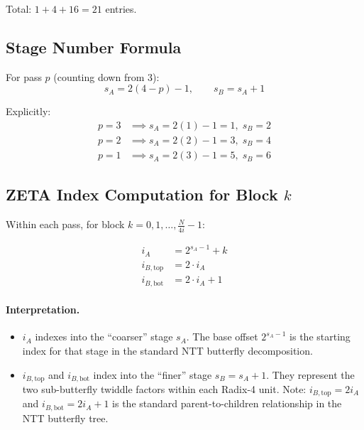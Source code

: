 \documentclass[11pt,a4paper]{article}
\begin{document}
Total: $1 + 4 + 16 = 21$ entries.

\subsection{Stage Number Formula}

For pass $p$ (counting down from 3):
\begin{equation}
  s_A = 2(4 - p) - 1, \qquad s_B = s_A + 1
  \label{eq:stage-map}
\end{equation}

Explicitly:
\begin{align*}
  p = 3 &\implies s_A = 2(1) - 1 = 1,\; s_B = 2 \\
  p = 2 &\implies s_A = 2(2) - 1 = 3,\; s_B = 4 \\
  p = 1 &\implies s_A = 2(3) - 1 = 5,\; s_B = 6
\end{align*}

\subsection{ZETA Index Computation for Block $k$}

Within each pass, for block $k = 0, 1, \ldots, \frac{N}{4i} - 1$:

\begin{align}
  i_A         &= 2^{s_A - 1} + k \label{eq:iA}\\
  i_{B,\text{top}} &= 2 \cdot i_A \label{eq:iB-top}\\
  i_{B,\text{bot}} &= 2 \cdot i_A + 1 \label{eq:iB-bot}
\end{align}

\paragraph{Interpretation.}
\begin{itemize}
  \item $i_A$ indexes into the ``coarser'' stage $s_A$. The base offset $2^{s_A-1}$ is the starting index for that stage in the standard NTT butterfly decomposition.
  \item $i_{B,\text{top}}$ and $i_{B,\text{bot}}$ index into the ``finer'' stage $s_B = s_A + 1$. They represent the two sub-butterfly twiddle factors within each Radix-4 unit. Note: $i_{B,\text{top}} = 2i_A$ and $i_{B,\text{bot}} = 2i_A + 1$ is the standard parent-to-children relationship in the NTT butterfly tree.
\end{itemize}
\end{document}
